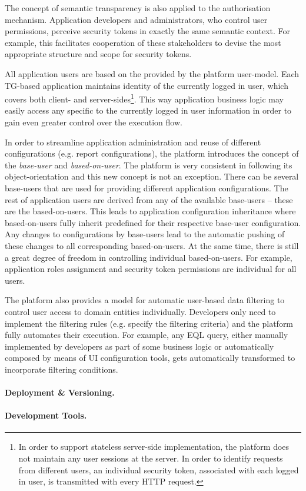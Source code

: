   The concept of semantic transparency is also applied to the authorisation mechanism.
  Application developers and administrators, who control user permissions, perceive security tokens in exactly the same semantic context.
  For example, this facilitates cooperation of these stakeholders to devise the most appropriate structure and scope for security tokens.

  All application users are based on the provided by the platform user-model.
  Each TG-based application maintains identity of the currently logged in user, which covers both client- and server-sides\footnote{
    In order to support stateless server-side implementation, the platform does not maintain any user sessions at the server. 
    In order to identify requests from different users, an individual security token, associated with each logged in user, is transmitted with every HTTP request.}.
  This way application business logic may easily access any specific to the currently logged in user information in order to gain even greater control over the  execution flow.
  
  In order to streamline application administration and reuse of different configurations (e.g. report configurations), the platform introduces the concept of the \emph{base-user} and \emph{based-on-user}.
  The platform is very consistent in following its object-orientation and this new concept is not an exception.
  There can be several base-users that are used for providing different application configurations.
  The rest of application users are derived from any of the available base-users -- these are the based-on-users.
  This leads to application configuration inheritance where based-on-users fully inherit predefined for their respective base-user configuration.
  Any changes to configurations by base-users lead to the automatic pushing of these changes to all corresponding based-on-users.
  At the same time, there is still a great degree of freedom in controlling individual based-on-users.
  For example, application roles assignment and security token permissions are individual for all users.
  
  The platform also provides a model for automatic user-based data filtering to control user access to domain entities individually.
  Developers only need to implement the filtering rules (e.g. specify the filtering criteria) and the platform fully automates their execution.
  For example, any EQL query, either manually implemented by developers as part of some business logic or automatically composed by means of UI configuration tools, gets automatically transformed to incorporate filtering conditions.

\paragraph{Deployment \& Versioning.}


\paragraph{Development Tools.}
